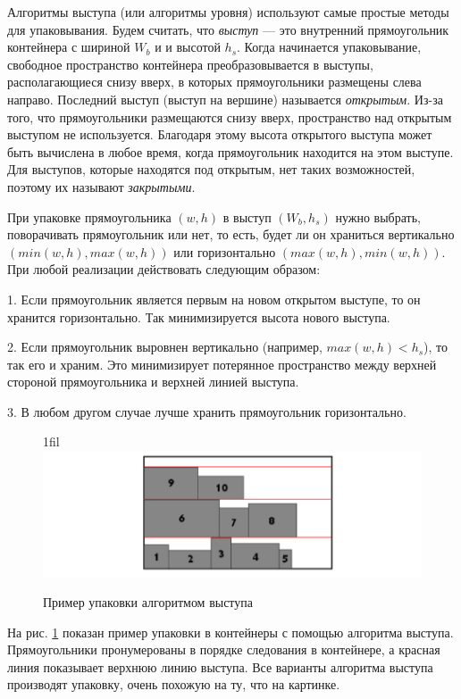 \documentclass[a4paper,12pt]{report}
\makeatletter
\newcommand*{\centerfloat}{%
  \parindent \z@
  \leftskip \z@ \@plus 1fil \@minus \textwidth
  \rightskip\leftskip
  \parfillskip \z@skip}
\makeatother
\begin{document}
Алгоритмы выступа (или алгоритмы уровня) используют самые простые методы для упаковывания. Будем считать, что \textit{выступ} — это внутренний прямоугольник контейнера с шириной $W_b$ и и высотой $h_s$. Когда начинается упаковывание, свободное пространство контейнера преобразовывается в выступы, располагающиеся снизу вверх, в которых прямоугольники размещены слева направо. Последний выступ (выступ на вершине) называется \textit{открытым}. Из-за того, что прямоугольники размещаются снизу вверх, пространство над открытым выступом не используется. Благодаря этому высота открытого выступа может быть вычислена в любое время, когда прямоугольник находится на этом выступе. Для выступов, которые находятся под открытым, нет таких возможностей, поэтому их называют \textit{закрытыми}.

При упаковке прямоугольника $(w, h)$ в выступ $(W_b, h_s)$ нужно выбрать, поворачивать прямоугольник или нет, то есть, будет ли он храниться вертикально  $(min(w, h), max(w, h))$ или горизонтально $(max(w, h), min(w, h))$. При любой реализации действовать следующим образом:

1. Если прямоугольник является первым на новом открытом выступе, то он хранится горизонтально. Так минимизируется высота нового выступа.

2. Если прямоугольник выровнен вертикально (например, $max(w, h) < h_s$), то так его и храним. Это минимизирует потерянное пространство между верхней стороной прямоугольника и верхней линией выступа.

3. В любом другом случае лучше хранить прямоугольник горизонтально.

\begin{figure}
    \centerfloat
    \includegraphics[width=1\textwidth]{packing/1.png}
    \caption{Пример упаковки алгоритмом выступа}
    \label{fig:shelf}
\end{figure}

На рис. \ref{fig:shelf} показан пример упаковки в контейнеры с помощью алгоритма выступа. Прямоугольники пронумерованы в порядке следования в контейнере, а красная линия показывает верхнюю линию выступа. Все варианты алгоритма выступа производят упаковку, очень похожую на ту, что на картинке.
\end{document}
